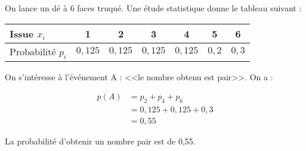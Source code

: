 \begin{myex}
	On lance un dé à 6 faces truqué. Une étude statistique donne le tableau suivant :
		\begin{center}
			
			\begin{tabular}{|@{\ }l@{\ }|@{\ }c@{\ }|@{\ }c@{\ }|@{\ }c@{\ }|@{\ }c@{\ }|@{\ }c@{\ }|@{\ }c@{\ }|}
				\hline
				Issue $x_i$ & 1 & 2 & 3 & 4 & 5 & 6 \\\hline
				Probabilité $p_i$ & $0,125$ & $0,125$ & $0,125$ & $0,125$ & $0,2$ & $0,3$ \\ \hline
			\end{tabular}
		
		\end{center}
	
	On s'intéresse à l'événement A : <<le nombre obtenu est pair>>.	On a : 
	
	\begin{align*}
		p(A) &= p_2 + p_4 + p_6 \\
			 &= 0,125 + 0,125 + 0,3 \\
			 &= 0,55
	\end{align*}
	
	La probabilité d'obtenir un nombre pair est de 0,55.
\end{myex}

